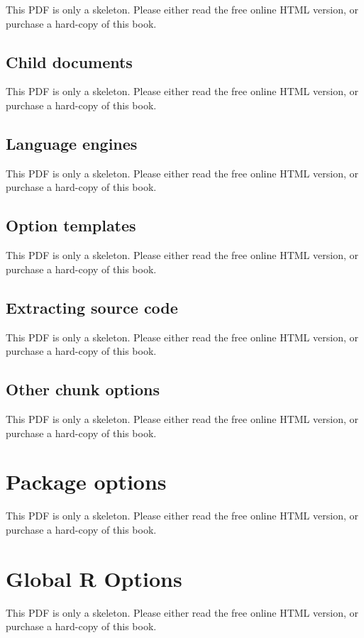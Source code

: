 \documentclass[
  11pt,
]{krantz}
\begin{document}
This PDF is only a skeleton. Please either read the free online HTML version, or purchase a hard-copy of this book.

\subsection{Child documents}\label{child-documents}

This PDF is only a skeleton. Please either read the free online HTML version, or purchase a hard-copy of this book.

\subsection{Language engines}\label{language-engines}

This PDF is only a skeleton. Please either read the free online HTML version, or purchase a hard-copy of this book.

\subsection{Option templates}\label{option-templates}

This PDF is only a skeleton. Please either read the free online HTML version, or purchase a hard-copy of this book.

\subsection{Extracting source code}\label{extracting-source-code}

This PDF is only a skeleton. Please either read the free online HTML version, or purchase a hard-copy of this book.

\subsection{Other chunk options}\label{other-chunk-options}

This PDF is only a skeleton. Please either read the free online HTML version, or purchase a hard-copy of this book.

\section{Package options}\label{package-options}

This PDF is only a skeleton. Please either read the free online HTML version, or purchase a hard-copy of this book.

\section{Global R Options}\label{global-r-options}

This PDF is only a skeleton. Please either read the free online HTML version, or purchase a hard-copy of this book.
\end{document}
